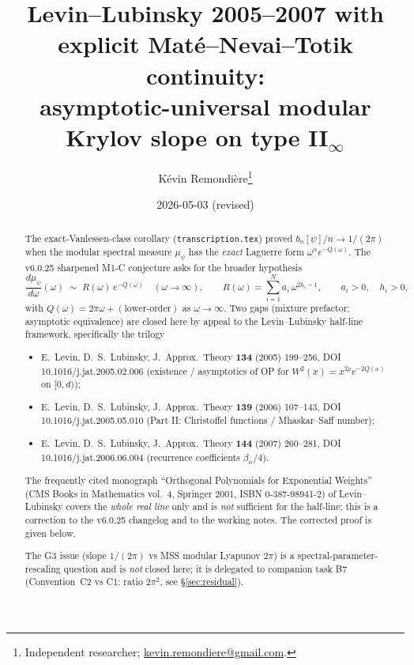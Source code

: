\documentclass[11pt]{article}
\title{Levin--Lubinsky 2005--2007 with explicit
Mat\'e--Nevai--Totik continuity:\\
asymptotic-universal modular Krylov slope on type II$_\infty$}
\author{K\'evin Remondi\`ere\thanks{Independent researcher; \href{mailto:kevin.remondiere@gmail.com}{kevin.remondiere@gmail.com}.}}
\date{2026-05-03 (revised)}
\theoremstyle{definition}
\begin{document}
\maketitle

\begin{abstract}
The exact-Vanlessen-class corollary (\texttt{transcription.tex})
proved $b_n[\psi]/n\to 1/(2\pi)$ when the modular spectral measure
$\mu_\psi$ has the \emph{exact} Laguerre form
$\omega^\alpha e^{-Q(\omega)}$. The v6.0.25 sharpened M1-C conjecture
asks for the broader hypothesis
\begin{equation*}
\frac{d\mu_\psi}{d\omega}(\omega)\;\sim\;
R(\omega)\,e^{-Q(\omega)}\quad(\omega\to\infty),\qquad
R(\omega)=\sum_{i=1}^{N} a_i\,\omega^{2h_i-1},\qquad a_i>0,\quad h_i>0,
\end{equation*}
with $Q(\omega)=2\pi\omega+(\text{lower-order})$ as $\omega\to\infty$.
Two gaps (mixture prefactor; asymptotic equivalence)
are closed here by appeal to the Levin--Lubinsky half-line
framework, specifically the trilogy
\begin{itemize}
\item E.\ Levin, D.\ S.\ Lubinsky, J.\ Approx.\ Theory \textbf{134}
   (2005) 199--256, DOI 10.1016/j.jat.2005.02.006 (existence /
   asymptotics of OP for $W^2(x)=x^{2\rho}e^{-2Q(x)}$ on $[0,d)$);
\item E.\ Levin, D.\ S.\ Lubinsky, J.\ Approx.\ Theory \textbf{139}
   (2006) 107--143, DOI 10.1016/j.jat.2005.05.010 (Part II:
   Christoffel functions / Mhaskar--Saff number);
\item E.\ Levin, D.\ S.\ Lubinsky, J.\ Approx.\ Theory \textbf{144}
   (2007) 260--281, DOI 10.1016/j.jat.2006.06.004 (recurrence
   coefficients $\beta_n/4$).
\end{itemize}
The frequently cited monograph
``Orthogonal Polynomials for Exponential Weights'' (CMS Books in
Mathematics vol.~4, Springer 2001, ISBN 0-387-98941-2) of Levin--Lubinsky
covers the \emph{whole real line} only and is \emph{not} sufficient for
the half-line; this is a correction to the v6.0.25 changelog and to
the working notes. The corrected proof is given below.

The G3 issue (slope $1/(2\pi)$ vs MSS modular Lyapunov $2\pi$) is a
spectral-parameter-rescaling question and is \emph{not} closed here;
it is delegated to companion task B7 (Convention~C2 vs C1: ratio
$2\pi^2$, see \S\ref{sec:residual}).


\end{abstract}
\end{document}
